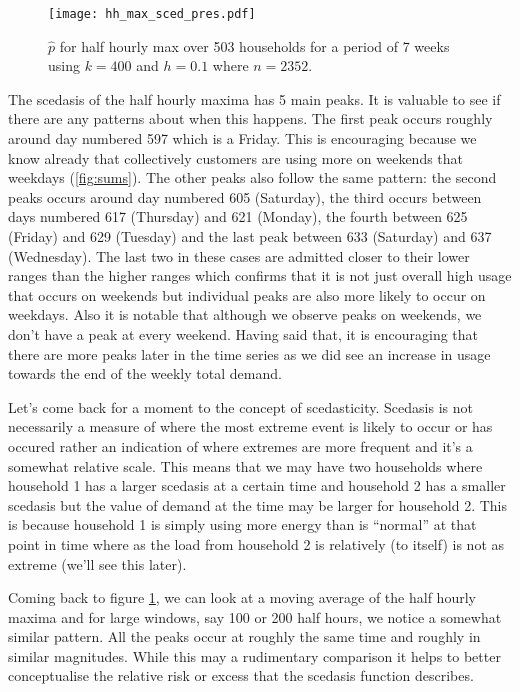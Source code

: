 \documentclass[a4paper]{article}
\begin{document}
\begin{figure}
\centering
\texttt{[image: hh\_max\_sced\_pres.pdf]}
\caption{\label{fig:mysced_hh_max} $\hat{p}$ for half hourly max over 503 households for a period of 7 weeks using $k=400$ and $h=0.1$ where $n=2352$.}
\end{figure}

The scedasis of the half hourly maxima has 5 main peaks. It is valuable to see if there are any patterns about when this happens. The first peak occurs roughly around day numbered 597 which is a Friday. This is encouraging because we know already that collectively customers are using more on weekends that weekdays (\ref{fig:sums}). The other peaks also follow the same pattern: the second peaks occurs around day numbered 605 (Saturday), the third occurs between days numbered 617 (Thursday) and 621 (Monday), the fourth between 625 (Friday) and 629 (Tuesday) and the last peak between 633 (Saturday) and 637 (Wednesday). The last two in these cases are admitted closer to their lower ranges than the higher ranges which confirms that it is not just overall high usage that occurs on weekends but individual peaks are also more likely to occur on weekdays. Also it is notable that although we observe peaks on weekends, we don't have a peak at every weekend. Having said that, it is encouraging that there are more peaks later in the time series as we did see an increase in usage towards the end of the weekly total demand.

Let's come back for a moment to the concept of scedasticity. Scedasis is not necessarily a measure of where the most extreme event is likely to occur or has occured rather an indication of where extremes are more frequent and it's a somewhat relative scale. This means that we may have two households where household 1 has a larger scedasis at a certain time and household 2 has a smaller scedasis but the value of demand at the time may be larger for household 2. This is because household 1 is simply using more energy than is ``normal'' at that point in time where as the load from household 2 is relatively (to itself) is not as extreme (we'll see this later).

Coming back to figure \ref{fig:mysced_hh_max}, we can look at a moving average of the half hourly maxima and for large windows, say 100 or 200 half hours, we notice a somewhat similar pattern.  All the peaks occur at roughly the same time and roughly in similar magnitudes. While this may a rudimentary comparison it helps to better conceptualise the relative risk or excess that the scedasis function describes.
\end{document}
